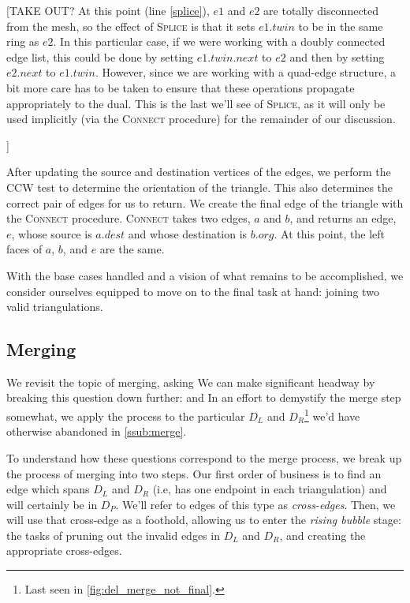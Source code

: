 \documentclass[12pt,twoside]{reedthesis}
\begin{document}
    [TAKE OUT? At this point (line \ref{splice}), $e1$ and $e2$ are totally disconnected from the mesh, so the effect of \textsc{Splice} is that it sets $e1.twin$ to be in the same ring as $e2$. In this particular case, if we were working with a doubly connected edge list, this could be done by setting $e1.twin.next$ to $e2$ and then by setting $e2.next$ to $e1.twin$. However, since we are working with a quad-edge structure, a bit more care has to be taken to ensure that these operations propagate appropriately to the dual. This is the last we'll see of \textsc{Splice}, as it will only be used implicitly (via the \textsc{Connect} procedure) for the remainder of our discussion.\par]

    After updating the source and destination vertices of the edges, we perform the \textsc{CCW} test to determine the orientation of the triangle. This also determines the correct pair of edges for us to return. We create the final edge of the triangle with the \textsc{Connect} procedure. \textsc{Connect} takes two edges, $a$ and $b$, and returns an edge, $e$, whose source is $a.dest$ and whose destination is $b.org$. At this point, the left faces of $a$, $b$, and $e$ are the same.\par

    With the base cases handled and a vision of what remains to be accomplished, we consider ourselves equipped to move on to the final task at hand: joining two valid triangulations. \par

  \subsection{Merging} %
  \label{sub:merging}

    We revisit the topic of merging, asking  We can make significant headway by breaking this question down further:  and  In an effort to demystify the merge step somewhat, we apply the process to the particular $D_{L}$ and $D_{R}$\footnote{Last seen in \cref{fig:del_merge_not_final}.} we'd have otherwise abandoned in \cref{ssub:merge}.\par

    To understand how these questions correspond to the merge process, we break up the process of merging into two steps. Our first order of business is to find an edge which spans $D_{L}$ and $D_{R}$ (i.e, has one endpoint in each triangulation) and will certainly be in $D_{P}$. We'll refer to edges of this type as \emph{cross-edges}. Then, we will use that cross-edge as a foothold, allowing us to enter the \emph{rising bubble} stage: the tasks of pruning out the invalid edges in $D_{L}$ and $D_{R}$, and creating the appropriate cross-edges.\par 
\end{document}
